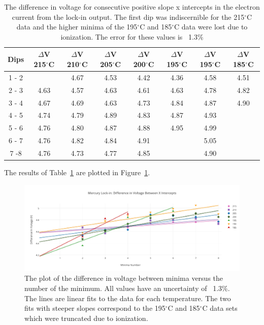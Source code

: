 \documentclass[prb,preprint]{revtex4-1}
\begin{document}
\begin{table}[h!]
\centering

\caption{The difference in voltage for consecutive positive slope x intercepts in the electron current from the lock-in output. The first dip was indiscernible for the 215$^{\circ}$C data and the higher minima of the 195$^{\circ}$C and 185$^{\circ}$C data were lost due to ionization. The error for these values is ~1.3$\%$}

\begin{ruledtabular}
\begin{tabular}{c c c c c c c c}
Dips & $\Delta$V 215$^{\circ}$C & $\Delta$V 210$^{\circ}$C  & $\Delta$V 205$^{\circ}$C &$\Delta$V 200$^{\circ}$C  & $\Delta$V 195$^{\circ}$C  & $\Delta$V 195$^{\circ}$C &$\Delta$V 185$^{\circ}$C  \\
\hline	%
1 - 2 &         & 4.67 & 4.53 & 4.42 & 4.36 & 4.58 & 4.51 \\
2 - 3 & 4.63 & 4.57 & 4.63 & 4.61 & 4.63 & 4.78 & 4.82 \\
3 - 4 & 4.67 & 4.69 & 4.63 & 4.73 & 4.84 & 4.87 & 4.90 \\
4 - 5 & 4.74 & 4.79 & 4.89 & 4.83 & 4.87 & 4.93 &         \\
5 - 6 & 4.76 & 4.80 & 4.87 & 4.88 & 4.95 & 4.99 &         \\
6 - 7 & 4.76 & 4.82 & 4.84 & 4.91 &         & 5.05 &         \\
7 -8  & 4.76 & 4.73 & 4.77 & 4.85 &         & 4.90 &         \\

\end{tabular}
\end{ruledtabular}
\label{hg_lockin_table}
\end{table}

The results of Table~\ref{hg_lockin_table} are plotted in Figure~\ref{lockin_intercepts}. 

\begin{figure}[h!]
\centering

\includegraphics[width=6in]{lockin_intercepts.pdf}
\caption{The plot of the difference in voltage between minima versus the number of the minimum. All values have an uncertainty of ~1.3$\%$. The lines are linear fits to the data for each temperature. The two fits with steeper slopes correspond to the 195$^{\circ}$C and 185$^{\circ}$C data sets which were truncated due to ionization.}

\label{lockin_intercepts}
\end{figure}
\end{document}
